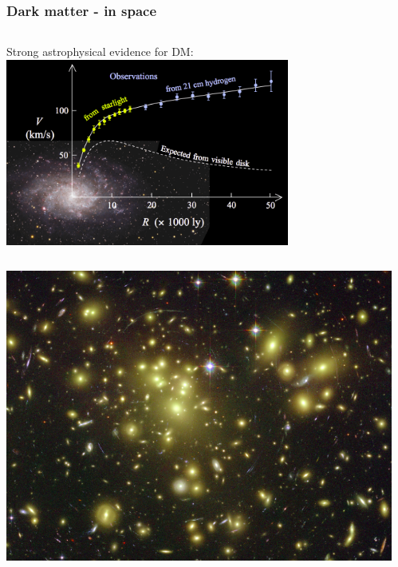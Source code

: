 \documentclass[aspectratio=169,xcolor=dvipsnames,,table,compress]{beamer}
\begin{document}
\begin{frame}  \frametitle{Dark matter - in space}
  \vspace{-7mm}
  \begin{columns}[T]
    \begin{column}{0.5\textwidth}
      \begin{center}  
        { Strong astrophysical evidence for DM:} \\ 
        \vspace{3mm}
        \includegraphics[width=0.7\textwidth]{../figures/talk/rotation.png} 
        \begin{columns}[T]
          \begin{column}{0.33\textwidth}
            \centering
            \includegraphics[width=\textwidth]{../figures/talk/lensing.png} 
          \end{column}
          \begin{column}{0.33\textwidth}
            \centering

\end{column}
\end{columns}
\end{center}
\end{column}
\end{columns}
\end{frame}
\end{document}

